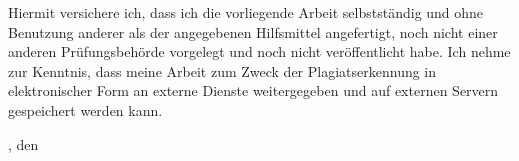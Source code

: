 \thispagestyle{empty}
\vspace*{0.67\textheight}
\noindent

Hiermit versichere ich, dass ich die vorliegende Arbeit selbstständig und ohne Benutzung anderer als der angegebenen Hilfsmittel angefertigt, noch nicht einer anderen Prüfungsbehörde vorgelegt und noch nicht veröffentlicht habe. Ich nehme zur Kenntnis, dass meine Arbeit zum Zweck der Plagiatserkennung in elektronischer Form an externe Dienste weitergegeben und auf externen Servern gespeichert werden kann.
\vspace{15mm}

\noindent
\city{}, den \submissionDate{} \hspace{80mm} \@author{}

\cleardoublepage{}